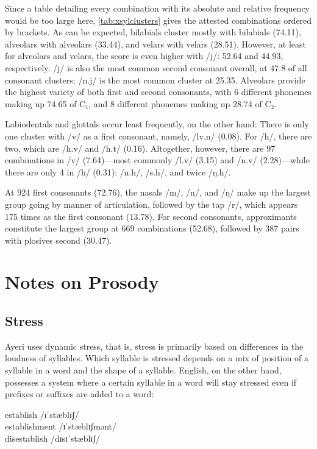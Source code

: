 Since a table detailing every combination with its absolute and relative 
frequency would be too large here, \autoref{tab:xsylclusters} gives the 
attested combinations ordered by brackets. As can be expected, bilabials cluster 
mostly with bilabials (74.11\pct), alveolars with alveolars (33.44\pct), and 
velars with velars (28.51\pct). However, at least for alveolars and velars, the 
score is even higher with /j/: 52.64\pct{} and 44.93\pct{}, respectively. /j/ 
is also the most common second consonant overall, at 47.8\pct{} of all 
consonant clusters; /n.j/ is the most common cluster at 25.35\pct{}. Alveolars 
provide the highest variety of both first and second consonants, with 6 
different phonemes making up 74.65\pct{} of C₁, and 8 different phonemes making 
up 28.74\pct{} of C₂.

Labiodentals and glottals occur least frequently, on the other hand: There is 
only one cluster with /v/ as a first consonant, namely, /lv.n/ (0.08\pct). 
For /h/, there are two, which are /h.v/ and /h.t/ (0.16\pct). Altogether, 
however, there are 97 combinations in /v/ (7.64\pct)---most commonly /l.v/ 
(3.15\pct) and /n.v/ (2.28\pct)---while there are only 4 in /h/ (0.31\pct): 
/n.h/, /s.h/, and twice /ŋ.h/.

At 924 first consonants (72.76\pct), the nasals /m/, /n/, and /ŋ/ make up the 
largest group going by manner of articulation, followed by the tap /r/, which 
appears 175 times as the first consonant (13.78\pct). For second consonants, 
approximants constitute the largest group at 669 combinations (52.68\pct), 
followed by 387 pairs with plosives second (30.47\pct).

\section{Notes on Prosody}

\subsection{Stress}

Ayeri uses dynamic stress, that is, stress is primarily based on differences in 
the loudness of syllables. Which syllable is stressed depends on a mix of 
position of a syllable in a word and the shape of a syllable. English, on the 
other hand, possesses a system where a certain syllable in a word will stay 
stressed even if prefixes or suffixes are added to a word:

\ex
	establish /ɪˈstæblɪʃ/\\
	establishment /ɪˈstæblɪʃmənt/\\
	disestablish /dɪsɪˈstæblɪʃ/
\xe

